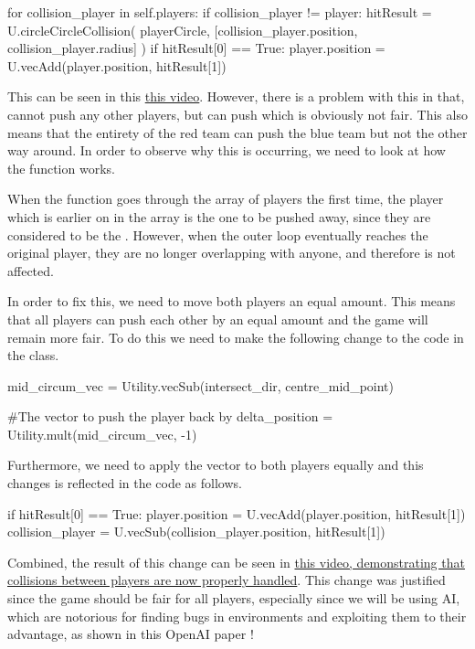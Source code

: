 \begin{mpy}
            for collision_player in self.players:
                if collision_player != player:
                    hitResult = U.circleCircleCollision(
                            playerCircle, [collision_player.position, collision_player.radius]
                    )
                    if hitResult[0] == True:
                        player.position = U.vecAdd(player.position, hitResult[1])
\end{mpy}

This can be seen in this \href{https://youtu.be/BrL2xX1aqjc}{this video}. However, there is a problem with this in that,  cannot push any other players, but  can push  which is obviously not fair. This also means that the entirety of the red team can push the blue team but not the other way around. In order to observe why this is occurring, we need to look at how the function works.

\vs
When the function goes through the array of players the first time, the player which is earlier on in the array is the one to be pushed away, since they are considered to be the . However, when the outer  loop eventually reaches the original player, they are no longer overlapping with anyone, and therefore is not affected.

\vs
In order to fix this, we need to move both players an equal amount. This means that all players can push each other by an equal amount and the game will remain more fair.
\vs
To do this we need to make the following change to the code in the  class.

\begin{mpy}
        mid_circum_vec = Utility.vecSub(intersect_dir, centre_mid_point)

        #The vector to push the player back by
        delta_position = Utility.mult(mid_circum_vec, -1)
\end{mpy}

Furthermore, we need to apply the  vector to both players equally and this changes is reflected in the code as follows.

\begin{mpy}
                    if hitResult[0] == True:
                        player.position = U.vecAdd(player.position, hitResult[1])
                        collision_player = U.vecSub(collision_player.position, hitResult[1])
\end{mpy}

Combined, the result of this change can be seen in \href{https://youtu.be/Tt9WJCQ5C9Y}{this video, demonstrating that collisions between players are now properly handled}. This change was justified since the game should be fair for all players, especially since we will be using AI, which are notorious for finding bugs in environments and exploiting them to their advantage, as shown in this OpenAI paper \cite{openai_emergent_tool}!

